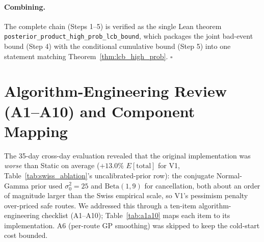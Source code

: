 \documentclass[opre,dblanonrev]{informs4}
\begin{document}
\begin{APPENDICES}
\paragraph{Combining.} The complete chain (Steps 1--5) is verified
as the single Lean theorem\linebreak
\texttt{posterior\_product\_\allowbreak high\_prob\_\allowbreak lcb\_\allowbreak bound}, which packages
the joint bad-event bound (Step 4) with the conditional cumulative
bound (Step 5) into one statement matching
Theorem~\ref{thm:lcb_high_prob}. \hfill$\square$

\section{Algorithm-Engineering Review (A1--A10) and Component Mapping}
\label{app:a1a10}

The 35-day cross-day evaluation revealed that the original
implementation was \emph{worse} than Static on average ($+13.0\%$
$E[\mathrm{total}]$ for V1, Table~\ref{tab:swiss_ablation}'s
uncalibrated-prior row):
the conjugate Normal-Gamma prior used $\sigma_0^2{=}25$ and
$\mathrm{Beta}(1,9)$ for cancellation, both about an order of
magnitude larger than the Swiss empirical scale, so V1's pessimism
penalty over-priced safe routes. We addressed this through a
ten-item algorithm-engineering checklist (A1--A10);
Table~\ref{tab:a1a10} maps each item to its implementation. A6
(per-route GP smoothing) was skipped to keep the cold-start cost
bounded.


\end{APPENDICES}
\end{document}
